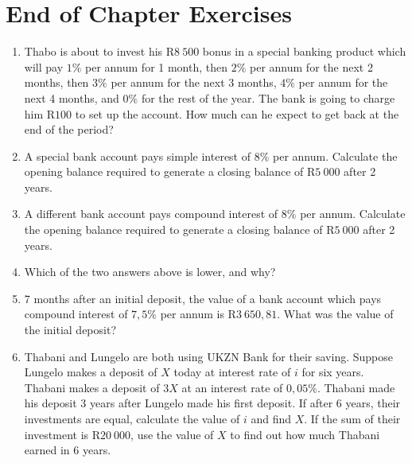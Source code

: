 
\section{End of Chapter Exercises}
\begin{enumerate}
\item{Thabo is about to invest his R$8~500$ bonus in a special banking product which will pay $1\%$ per annum for 1 month, then $2\%$ per annum for the next 2 months, then $3\%$ per annum for the next 3 months, $4\%$ per annum for the next 4 months, and $0\%$ for the rest of the year. The bank is going to charge him R$100$ to set up the account. How much can he expect to get back at the end of the period?}

\item{A special bank account pays simple interest of $8\%$ per annum. Calculate the opening balance required to generate a closing balance of R$5~000$ after 2 years.}

\item{A different bank account pays compound interest of $8\%$ per annum. Calculate the opening balance required to generate a closing balance of R$5~000$ after 2 years.}

\item{Which of the two answers above is lower, and why?}

\item{7 months after an initial deposit, the value of a bank account which pays compound interest of $7,5\%$ per annum is R$3~650,81$. What was the value of the initial deposit?}


\item{Thabani and Lungelo are both using UKZN Bank for their saving. Suppose Lungelo makes a deposit of $X$ today at interest rate of $i$ for six years. Thabani makes a deposit of $3X$ at an interest rate of $0,05\%$. Thabani made his deposit 3 years after Lungelo made his first deposit. If after 6 years, their investments are equal, calculate the value of $i$ and find $X$. If the sum of their investment is R$20~000$, use the value of $X$ to find out how much Thabani earned in 6 years.}


\end{enumerate}
